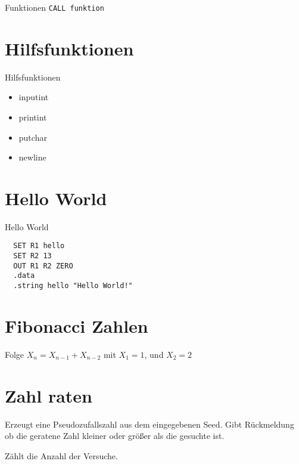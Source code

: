 \begin{frame}{Funktionen}  
 \texttt{CALL funktion} 
\end{frame}



\section{Hilfsfunktionen}

\begin{frame}{Hilfsfunktionen}
 \begin{itemize}
  \item inputint
  \item printint
  \item putchar
  \item newline
 \end{itemize}
\end{frame}



\section{Hello World}

\begin{frame}[fragile]{Hello World}
 \begin{lstlisting}
  SET R1 hello
  SET R2 13
  OUT R1 R2 ZERO
  .data
  .string hello "Hello World!"
 \end{lstlisting}
\end{frame}


\section{Fibonacci Zahlen}

\begin{frame}{\insertsection}%
 Folge $X_{n} = X_{n-1} + X_{n-2}$
 mit $X_{1} = 1$, und $X_{2} = 2$
\end{frame}



\section{Zahl raten}

\begin{frame}{\insertsection}%
 Erzeugt eine Pseudozufallszahl aus dem eingegebenen Seed.
 Gibt Rückmeldung ob die geratene Zahl kleiner oder größer 
 als die gesuchte ist.
 
 Zählt die Anzahl der Versuche.
\end{frame}


